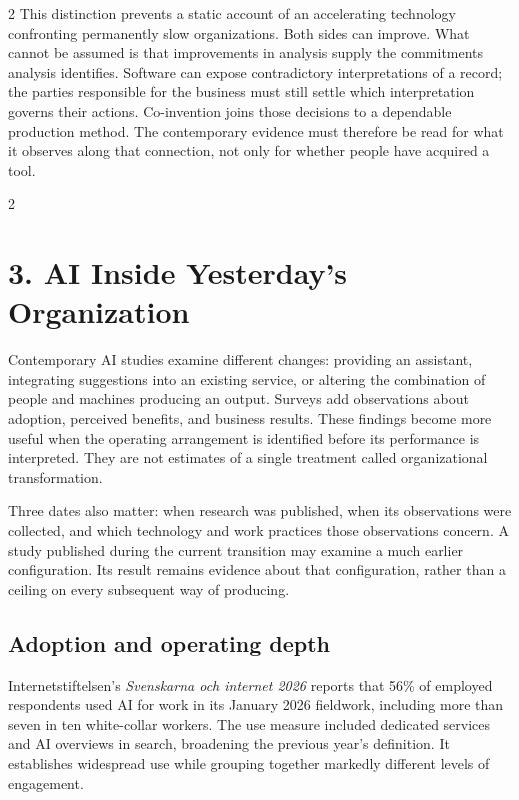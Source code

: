 \begin{multicols}{2}
This distinction prevents a static account of an accelerating technology
confronting permanently slow organizations. Both sides can improve. What
cannot be assumed is that improvements in analysis supply the
commitments analysis identifies. Software can expose contradictory
interpretations of a record; the parties responsible for the business
must still settle which interpretation governs their actions.
Co-invention joins those decisions to a dependable production method.
The contemporary evidence must therefore be read for what it observes
along that connection, not only for whether people have acquired a tool.

\end{multicols}

\CoInventionArt

\clearpage
\begin{multicols}{2}

\section{3. AI Inside Yesterday's
Organization}\label{ai-inside-yesterdays-organization}

Contemporary AI studies examine different changes: providing an
assistant, integrating suggestions into an existing service, or altering
the combination of people and machines producing an output. Surveys add
observations about adoption, perceived benefits, and business results.
These findings become more useful when the operating arrangement is
identified before its performance is interpreted. They are not estimates
of a single treatment called organizational transformation.

Three dates also matter: when research was published, when its
observations were collected, and which technology and work practices
those observations concern. A study published during the current
transition may examine a much earlier configuration. Its result remains
evidence about that configuration, rather than a ceiling on every
subsequent way of producing.

\subsection{Adoption and operating
depth}\label{adoption-and-operating-depth}

Internetstiftelsen's \emph{Svenskarna och internet 2026}
\citep{internetstiftelsen2026internet} reports that 56\% of employed
respondents used AI for work in its January 2026 fieldwork, including
more than seven in ten white-collar workers. The use measure included
dedicated services and AI overviews in search, broadening the previous
year's definition. It establishes widespread use while grouping together
markedly different levels of engagement.


\end{multicols}

